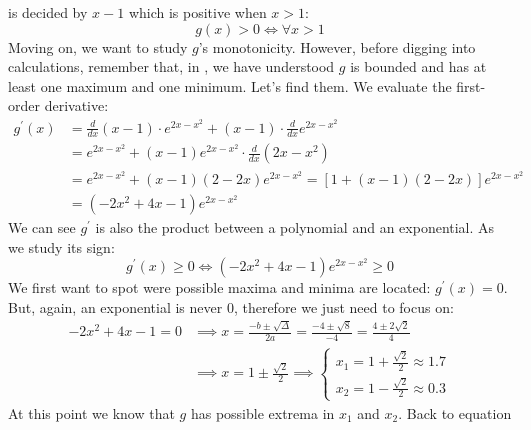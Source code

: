 is decided by $x-1$ which is positive when $x > 1$:
\begin{equation*}
    g(x) > 0 \iff \forall x > 1
\end{equation*}
Moving on, we want to study $g$'s monotonicity. However, before digging
into calculations, remember that, in , we have understood
$g$ is bounded and has at least one maximum and one minimum. Let's find them. 
We evaluate the first-order derivative:
\begin{equation*}
    \begin{split}
        g^\prime(x) &= \frac{d}{dx} (x - 1) \cdot e^{2x - x^2} + (x - 1) \cdot \frac{d}{dx} e^{2x - x^2}\\
            &= e^{2x - x^2} + (x - 1)  e^{2x - x^2} \cdot \frac{d}{dx} (2x - x^2)\\
            &= e^{2x - x^2} + (x - 1) (2 - 2x) e^{2x - x^2}
                = \left[ 1 + (x - 1) (2 - 2x) \right] e^{2x - x^2}\\
            &= (-2x^2 + 4x - 1) e^{2x - x^2}
    \end{split}
\end{equation*}
We can see $g^\prime$ is also the product between a polynomial and an exponential.
As we study its sign:
\begin{equation}\label{eq:gprimegeqzero}
    g^\prime(x) \geq 0 \iff (-2x^2 + 4x - 1) e^{2x - x^2} \geq 0
\end{equation}
We first want to spot were possible maxima and minima are located: $g^\prime(x) = 0$.
But, again, an exponential is never $0$, therefore we just need to focus on:
\begin{equation}\label{eq:grpimenull}
    \begin{split}
        -2x^2 + 4x - 1 = 0 &\implies x = \frac{-b \pm \sqrt{\Delta}}{2a} =
        \frac{-4 \pm \sqrt{8}}{-4} = \frac{4 \pm 2\sqrt{2}}{4}\\
        &\implies
        x = 1 \pm \frac{\sqrt{2}}{2} \implies
        \begin{cases}
            x_1 = 1 + \frac{\sqrt{2}}{2} \approx 1.7\\
            x_2 = 1 - \frac{\sqrt{2}}{2} \approx 0.3
        \end{cases}
    \end{split}
\end{equation}
At this point we know that $g$ has possible extrema in $x_1$ and $x_2$. Back to equation
